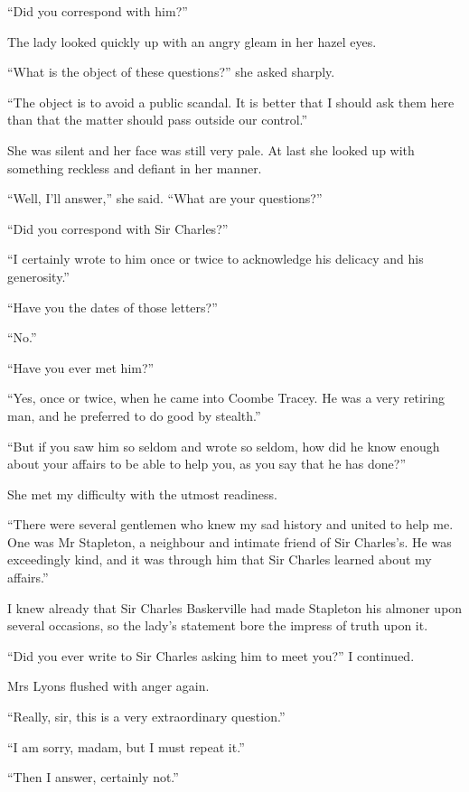 \documentclass[paper=a5,BCOR=7mm,twoside,DIV=calc,12pt,usegeometry,openany,chapterprefix,endperiod,headings=big]{scrbook} %
\begin{document}
\enquote{Did you correspond with him?}

The lady looked quickly up with an angry gleam in her hazel eyes.

\enquote{What is the object of these questions?} she asked sharply.

\enquote{The object is to avoid a public scandal. It is better that I should ask them here than that the matter should pass outside our control.}

She was silent and her face was still very pale. At last she looked up with something reckless and defiant in her manner.

\enquote{Well, I'll answer,} she said. \enquote{What are your questions?}

\enquote{Did you correspond with Sir Charles?}

\enquote{I certainly wrote to him once or twice to acknowledge his delicacy and his generosity.}

\enquote{Have you the dates of those letters?}

\enquote{No.}

\enquote{Have you ever met him?}

\enquote{Yes, once or twice, when he came into Coombe Tracey. He was a very retiring man, and he preferred to do good by stealth.}

\enquote{But if you saw him so seldom and wrote so seldom, how did he know enough about your affairs to be able to help you, as you say that he has done?}

She met my difficulty with the utmost readiness.

\enquote{There were several gentlemen who knew my sad history and united to help me. One was Mr Stapleton, a neighbour and intimate friend of Sir Charles's. He was exceedingly kind, and it was through him that Sir Charles learned about my affairs.}

I knew already that Sir Charles Baskerville had made Stapleton his almoner upon several occasions, so the lady's statement bore the impress of truth upon it.

\enquote{Did you ever write to Sir Charles asking him to meet you?} I continued.

Mrs Lyons flushed with anger again.

\enquote{Really, sir, this is a very extraordinary question.}

\enquote{I am sorry, madam, but I must repeat it.}

\enquote{Then I answer, certainly not.}
\end{document}

